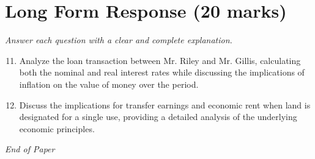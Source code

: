 \documentclass[12pt]{article}
\begin{document}
\section*{Long Form Response (20 marks)}
\textit{Answer each question with a clear and complete explanation.}
\begin{enumerate}[label=\arabic*.]
\setcounter{enumi}{10}
\item Analyze the loan transaction between Mr. Riley and Mr. Gillis, calculating both the nominal and real interest rates while discussing the implications of inflation on the value of money over the period.
\item Discuss the implications for transfer earnings and economic rent when land is designated for a single use, providing a detailed analysis of the underlying economic principles.
\end{enumerate}

\vfill
\noindent\textit{End of Paper}
\end{document}
